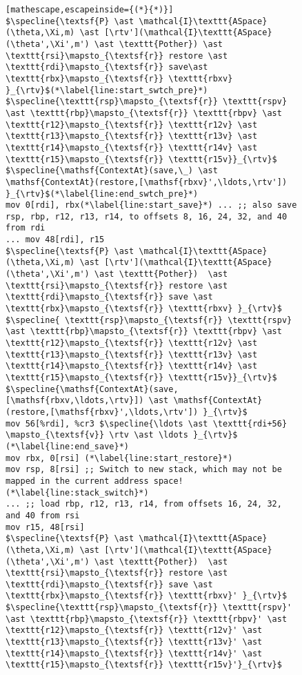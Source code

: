 \begin{figure}\footnotesize
\begin{lstlisting}[mathescape,escapeinside={(*}{*)}]
$\specline{\textsf{P} \ast \mathcal{I}\texttt{ASpace}(\theta,\Xi,m) \ast [\rtv'](\mathcal{I}\texttt{ASpace}(\theta',\Xi',m') \ast \texttt{Pother}) \ast \texttt{rsi}\mapsto_{\textsf{r}} restore \ast \texttt{rdi}\mapsto_{\textsf{r}} save\ast \texttt{rbx}\mapsto_{\textsf{r}} \texttt{rbxv} }_{\rtv}$(*\label{line:start_swtch_pre}*)
$\specline{\texttt{rsp}\mapsto_{\textsf{r}} \texttt{rspv} \ast \texttt{rbp}\mapsto_{\textsf{r}} \texttt{rbpv} \ast \texttt{r12}\mapsto_{\textsf{r}} \texttt{r12v} \ast \texttt{r13}\mapsto_{\textsf{r}} \texttt{r13v} \ast \texttt{r14}\mapsto_{\textsf{r}} \texttt{r14v} \ast \texttt{r15}\mapsto_{\textsf{r}} \texttt{r15v}}_{\rtv}$
$\specline{\mathsf{ContextAt}(save,\_) \ast \mathsf{ContextAt}(restore,[\mathsf{rbxv}',\ldots,\rtv']) }_{\rtv}$(*\label{line:end_swtch_pre}*)
mov 0[rdi], rbx(*\label{line:start_save}*) ... ;; also save rsp, rbp, r12, r13, r14, to offsets 8, 16, 24, 32, and 40 from rdi
... mov 48[rdi], r15
$\specline{\textsf{P} \ast \mathcal{I}\texttt{ASpace}(\theta,\Xi,m) \ast [\rtv'](\mathcal{I}\texttt{ASpace}(\theta',\Xi',m') \ast \texttt{Pother})  \ast  \texttt{rsi}\mapsto_{\textsf{r}} restore \ast \texttt{rdi}\mapsto_{\textsf{r}} save \ast \texttt{rbx}\mapsto_{\textsf{r}} \texttt{rbxv} }_{\rtv}$
$\specline{ \texttt{rsp}\mapsto_{\textsf{r}} \texttt{rspv} \ast \texttt{rbp}\mapsto_{\textsf{r}} \texttt{rbpv} \ast \texttt{r12}\mapsto_{\textsf{r}} \texttt{r12v} \ast \texttt{r13}\mapsto_{\textsf{r}} \texttt{r13v} \ast \texttt{r14}\mapsto_{\textsf{r}} \texttt{r14v} \ast \texttt{r15}\mapsto_{\textsf{r}} \texttt{r15v}}_{\rtv}$
$\specline{\mathsf{ContextAt}(save,[\mathsf{rbxv,\ldots,\rtv}]) \ast \mathsf{ContextAt}(restore,[\mathsf{rbxv}',\ldots,\rtv']) }_{\rtv}$
mov 56[%rdi], %cr3 $\specline{\ldots \ast \texttt{rdi+56} \mapsto_{\textsf{v}} \rtv \ast \ldots }_{\rtv}$   (*\label{line:end_save}*) 
mov rbx, 0[rsi] (*\label{line:start_restore}*)
mov rsp, 8[rsi] ;; Switch to new stack, which may not be mapped in the current address space!(*\label{line:stack_switch}*)
... ;; load rbp, r12, r13, r14, from offsets 16, 24, 32, and 40 from rsi
mov r15, 48[rsi]
$\specline{\textsf{P} \ast \mathcal{I}\texttt{ASpace}(\theta,\Xi,m) \ast [\rtv'](\mathcal{I}\texttt{ASpace}(\theta',\Xi',m') \ast \texttt{Pother})  \ast  \texttt{rsi}\mapsto_{\textsf{r}} restore \ast \texttt{rdi}\mapsto_{\textsf{r}} save \ast \texttt{rbx}\mapsto_{\textsf{r}} \texttt{rbxv}' }_{\rtv}$
$\specline{\texttt{rsp}\mapsto_{\textsf{r}} \texttt{rspv}' \ast \texttt{rbp}\mapsto_{\textsf{r}} \texttt{rbpv}' \ast \texttt{r12}\mapsto_{\textsf{r}} \texttt{r12v}' \ast \texttt{r13}\mapsto_{\textsf{r}} \texttt{r13v}' \ast \texttt{r14}\mapsto_{\textsf{r}} \texttt{r14v}' \ast \texttt{r15}\mapsto_{\textsf{r}} \texttt{r15v}'}_{\rtv}$

\end{lstlisting}
\end{figure}
